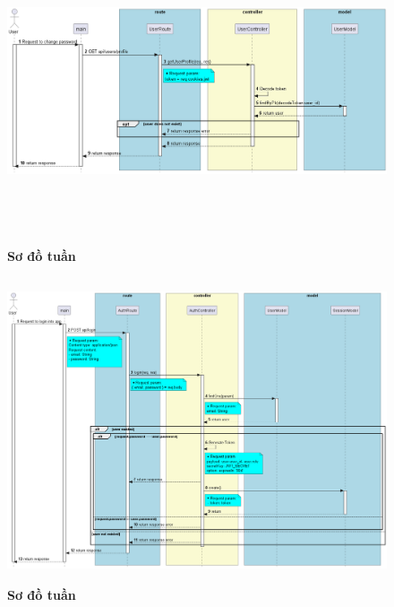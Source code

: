 \begin{figure}[H]
  \centering
  \includegraphics[width=16cm,height=9cm]{Images/server/sequence/server/getUserProfile.png}
  \caption[Sơ đồ tuần tự ]{\bfseries \fontsize{12pt}{0pt}
  \selectfont Sơ đồ tuần }
  \label{hinh21} %
\end{figure}

\begin{figure}[H]
  \centering
  \includegraphics[width=16cm,height=9cm]{Images/server/sequence/server/login.png}
  \caption[Sơ đồ tuần tự ]{\bfseries \fontsize{12pt}{0pt}
  \selectfont Sơ đồ tuần }
  \label{hinh21} %
\end{figure}

